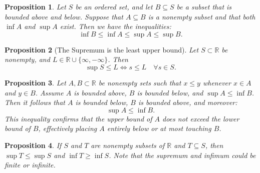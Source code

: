 \documentclass{article}
\newtheorem{proposition}{Proposition}[section]
\theoremstyle{definition}
\theoremstyle{remark}
\begin{document}
\begin{proposition} \label{ex:bounds_of_inf_sup}
Let \( S \) be an ordered set, and let \( B \subseteq S \) be a subset that is bounded above and below. Suppose that \( A \subseteq B \) is a nonempty subset and that both \( \inf A \) and \( \sup A \) exist. Then we have the inequalities:
\[
\inf B \leq \inf A \leq \sup A \leq \sup B.
\]
\end{proposition}







\begin{proposition}[The Supremum is the least upper bound]
Let \( S \subset \mathbb{R} \) be nonempty, and \( L \in \mathbb{R} \cup \{\infty, -\infty\} \). Then 
\[
\sup S \leq L \iff s \leq L \quad \forall s \in S.
\]

\end{proposition}










\begin{proposition} \label{ex:bound_compare}
Let \( A, B \subset \mathbb{R} \) be nonempty sets such that \( x \leq y \) whenever \( x \in A \) and \( y \in B \). Assume \( A \) is bounded above, \( B \) is bounded below, and \( \sup A \leq \inf B \). Then it follows that \( A \) is bounded below, \( B \) is bounded above, and moreover:
\[
\sup A \leq \inf B.
\]
This inequality confirms that the upper bound of \( A \) does not exceed the lower bound of \( B \), effectively placing \( A \) entirely below or at most touching \( B \).
\end{proposition}










\begin{proposition}\label{ex:sup_inf_subsets}
If \( S \) and \( T \) are nonempty subsets of \( \mathbb{R} \) and \( T \subseteq S \), then \( \sup T \leq \sup S \) and \( \inf T \geq \inf S \). Note that the supremum and infimum could be finite or infinite.
\end{proposition}
\end{document}
